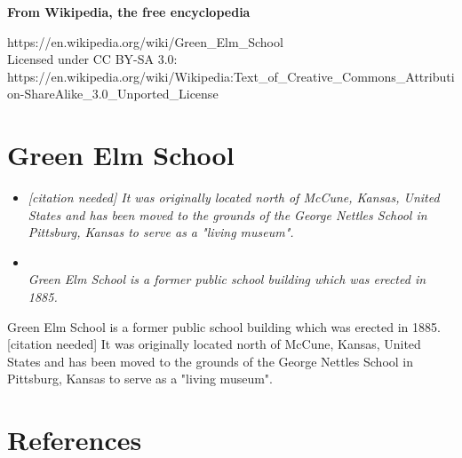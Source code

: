 \textbf{From Wikipedia, the free encyclopedia}

https://en.wikipedia.org/wiki/Green\_Elm\_School\\
Licensed under CC BY-SA 3.0:\\
https://en.wikipedia.org/wiki/Wikipedia:Text\_of\_Creative\_Commons\_Attribution-ShareAlike\_3.0\_Unported\_License

\section{Green Elm School}\label{green-elm-school}

\begin{itemize}
\item
  \emph{{[}citation needed{]} It was originally located north of McCune,
  Kansas, United States and has been moved to the grounds of the George
  Nettles School in Pittsburg, Kansas to serve as a "living museum".}
\item
  \emph{\\
  Green Elm School is a former public school building which was erected
  in 1885.}
\end{itemize}

Green Elm School is a former public school building which was erected in
1885.{[}citation needed{]} It was originally located north of McCune,
Kansas, United States and has been moved to the grounds of the George
Nettles School in Pittsburg, Kansas to serve as a "living museum".

\section{References}\label{references}
